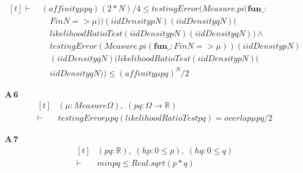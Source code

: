 {\[\begin{aligned}[t]
\vdash\;&(\mathit{affinity} \mu \mathit{p} \mathit{q})^{}(2*\mathit{N})/4 \leq \mathit{testingError} (\mathit{Measure}.\mathit{pi} (\mathbf{fun} \mathit{\_} :\\
&\quad \mathit{Fin} \mathit{N} => \mu )) (\mathit{iidDensity} \mathit{p} \mathit{N}) (\mathit{iidDensity} \mathit{q} \mathit{N}) (\\
&\quad \mathit{likelihoodRatioTest} (\mathit{iidDensity} \mathit{p} \mathit{N}) (\mathit{iidDensity} \mathit{q} \mathit{N})) \wedge\\
&\quad \mathit{testingError} (\mathit{Measure}.\mathit{pi} (\mathbf{fun} \mathit{\_} : \mathit{Fin} \mathit{N} => \mu )) (\mathit{iidDensity} \mathit{p} \mathit{N})\\
&\quad (\mathit{iidDensity} \mathit{q} \mathit{N}) (\mathit{likelihoodRatioTest} (\mathit{iidDensity} \mathit{p} \mathit{N}) (\\
&\quad \mathit{iidDensity} \mathit{q} \mathit{N})) \leq (\mathit{affinity} \mu \mathit{p} \mathit{q})^{\mathit{N}}/2
\end{aligned} \]}

\noindent\textbf{A\,6}\quad{}
{\footnotesize\[ \begin{aligned}[t]
&(\mu : \mathit{Measure} \Omega ),\; (\mathit{p} \mathit{q} : \Omega \to \mathbb{R} )\\
\vdash\;&\mathit{testingError} \mu \mathit{p} \mathit{q} (\mathit{likelihoodRatioTest} \mathit{p} \mathit{q}) = \mathit{overlap} \mu \mathit{p} \mathit{q}/2
\end{aligned} \]}

\noindent\textbf{A\,7}\quad{}
{\footnotesize\[ \begin{aligned}[t]
&(\mathit{p} \mathit{q} : \mathbb{R} ),\; (\mathit{hp} : 0 \leq \mathit{p}),\; (\mathit{hq} : 0 \leq \mathit{q})\\
\vdash\;&\mathit{min} \mathit{p} \mathit{q} \leq \mathit{Real}.\mathit{sqrt} (\mathit{p}*\mathit{q})
\end{aligned} \]}

